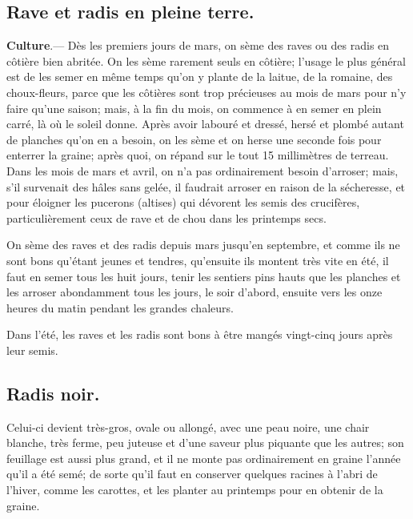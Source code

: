 \documentclass[10pt,a4paper]{book}
\begin{document}
\subsection{Rave et radis en pleine terre.}

\textbf{Culture}.--- Dès les premiers jours de mars, on sème des raves ou des radis en côtière bien abritée. On les sème rarement seuls en côtière; l'usage le plus général est de les semer en même temps qu'on y plante de la laitue, de la romaine, des choux-fleurs, parce que les côtières sont trop précieuses au mois de mars pour n'y faire qu'une saison; mais, à la fin du mois, on commence à en semer en plein carré, là où le soleil donne. Après avoir labouré et dressé, hersé et plombé autant de planches qu'on en a besoin, on les sème et on herse une seconde fois pour enterrer la graine; après quoi, on répand sur le tout 15 millimètres de terreau. Dans les mois de mars et avril, on n'a pas ordinairement besoin d'arroser; mais, s'il survenait des hâles sans gelée, il faudrait arroser en raison de la sécheresse, et pour éloigner les pucerons (altises) qui dévorent les semis des crucifères, particulièrement ceux de rave et de chou dans les printemps secs.

On sème des raves et des radis depuis mars jusqu'en septembre, et comme ils ne sont bons qu'étant jeunes et tendres, qu'ensuite ils montent très vite en été, il faut en semer tous les huit jours, tenir les sentiers pins hauts que les planches et les arroser abondamment tous les jours, le soir d'abord, ensuite vers les onze heures du matin pendant les grandes chaleurs.

Dans l'été, les raves et les radis sont bons à être mangés vingt-cinq jours après leur semis.

\subsection{Radis noir.}

Celui-ci devient très-gros, ovale ou allongé, avec une peau noire, une chair blanche, très ferme, peu juteuse et d'une saveur plus piquante que les autres; son feuillage est aussi plus grand, et il ne monte pas ordinairement en graine l'année qu'il a été semé; de sorte qu'il faut en conserver quelques racines à l'abri de l'hiver, comme les carottes, et les planter au printemps pour en obtenir de la graine.
\end{document}

